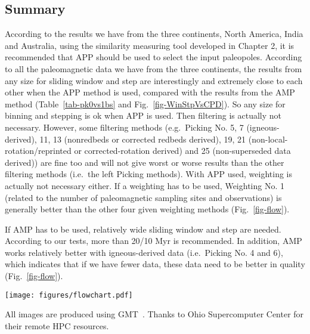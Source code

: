 \subsection{Summary}

According to the results we have from the three continents, North America, India
and Australia, using the similarity measuring tool developed in Chapter 2, it is
recommended that APP should be used to select the input paleopoles. According to
all the paleomagnetic data we have from the three continents, the results from
any size for sliding window and step are interestingly and extremely close to
each other when the APP method is used, compared with the results from the AMP
method (Table~\ref{tab-pk0vs1bs} and Fig.~\ref{fig-WinStpVsCPD}). So any size
for binning and stepping is ok when APP is used. Then filtering is actually not
necessary. However, some filtering methods (e.g.\ Picking No. 5, 7
(igneous-derived), 11, 13 (nonredbeds or corrected redbeds derived), 19, 21
(non-local-rotation/reprinted or corrected-rotation derived) and 25
(non-superseded data derived)) are fine too and will not give worst or worse
results than the other filtering methods (i.e.\ the left Picking methods). With
APP used, weighting is actually not necessary either. If a weighting has to be
used, Weighting No. 1 (related to the number of paleomagnetic sampling sites and
observations) is generally better than the other four given weighting methods
(Fig.~\ref{fig-flow}).

If AMP has to be used, relatively wide sliding window and step are needed.
According to our tests, more than 20/10 Myr is recommended. In addition, AMP
works relatively better with igneous-derived data (i.e.\ Picking No. 4 and 6),
which indicates that if we have fewer data, these data need to be better in
quality (Fig.~\ref{fig-flow}).

\begin{figure*}
\centering
\texttt{[image: figures/flowchart.pdf]}
\caption[Flowchart]{Flowchart for recommended procedure of processing
  paleomagnetic data.}\label{fig-flow}
\end{figure*}

\begin{acknowledgments}
All images are produced using GMT~\cite{W13}. Thanks to Ohio Supercomputer
Center for their remote HPC resources.
\end{acknowledgments}

